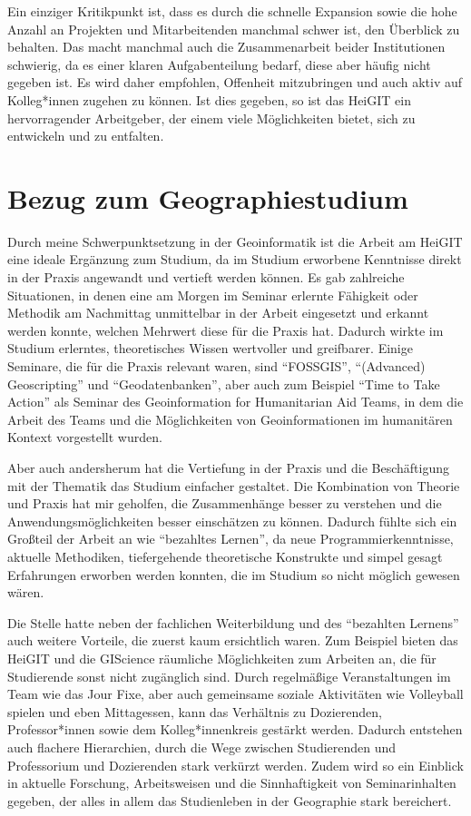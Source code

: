 \documentclass[11pt]{article}
\begin{document}
Ein einziger Kritikpunkt ist, dass es durch die schnelle Expansion sowie die hohe Anzahl an Projekten und Mitarbeitenden manchmal schwer ist, den Überblick zu behalten. Das macht manchmal auch die Zusammenarbeit beider Institutionen schwierig, da es einer klaren Aufgabenteilung bedarf, diese aber häufig nicht gegeben ist. Es wird daher empfohlen, Offenheit mitzubringen und auch aktiv auf Kolleg*innen zugehen zu können. Ist dies gegeben, so ist das HeiGIT ein hervorragender Arbeitgeber, der einem viele Möglichkeiten bietet, sich zu entwickeln und zu entfalten.  

\section{Bezug zum Geographiestudium}

Durch meine Schwerpunktsetzung in der Geoinformatik ist die Arbeit am HeiGIT eine ideale Ergänzung zum Studium, da im Studium erworbene Kenntnisse direkt in der Praxis angewandt und vertieft werden können. Es gab zahlreiche Situationen, in denen eine am Morgen im Seminar erlernte Fähigkeit oder Methodik am Nachmittag unmittelbar in der Arbeit eingesetzt und erkannt werden konnte, welchen Mehrwert diese für die Praxis hat. Dadurch wirkte im Studium erlerntes, theoretisches Wissen wertvoller und greifbarer. Einige Seminare, die für die Praxis relevant waren, sind \enquote{FOSSGIS}, \enquote{(Advanced) Geoscripting} und \enquote{Geodatenbanken}, aber auch zum Beispiel \enquote{Time to Take Action} als Seminar des Geoinformation for Humanitarian Aid Teams, in dem die Arbeit des Teams und die Möglichkeiten von Geoinformationen im humanitären Kontext vorgestellt wurden.

Aber auch andersherum hat die Vertiefung in der Praxis und die Beschäftigung mit der Thematik das Studium einfacher gestaltet. Die Kombination von Theorie und Praxis hat mir geholfen, die Zusammenhänge besser zu verstehen und die Anwendungsmöglichkeiten besser einschätzen zu können. Dadurch fühlte sich ein Großteil der Arbeit an wie \enquote{bezahltes Lernen}, da neue Programmierkenntnisse, aktuelle Methodiken, tiefergehende theoretische Konstrukte und simpel gesagt Erfahrungen erworben werden konnten, die im Studium so nicht möglich gewesen wären.

Die Stelle hatte neben der fachlichen Weiterbildung und des \enquote{bezahlten Lernens} auch weitere Vorteile, die zuerst kaum ersichtlich waren. Zum Beispiel bieten das HeiGIT und die GIScience räumliche Möglichkeiten zum Arbeiten an, die für Studierende sonst nicht zugänglich sind. Durch regelmäßige Veranstaltungen im Team wie das Jour Fixe, aber auch gemeinsame soziale Aktivitäten wie Volleyball spielen und eben Mittagessen, kann das Verhältnis zu Dozierenden, Professor*innen sowie dem Kolleg*innenkreis gestärkt werden. Dadurch entstehen auch flachere Hierarchien, durch die Wege zwischen Studierenden und Professorium und Dozierenden stark verkürzt werden. Zudem wird so ein Einblick in aktuelle Forschung, Arbeitsweisen und die Sinnhaftigkeit von Seminarinhalten gegeben, der alles in allem das Studienleben in der Geographie stark bereichert.
\end{document}
